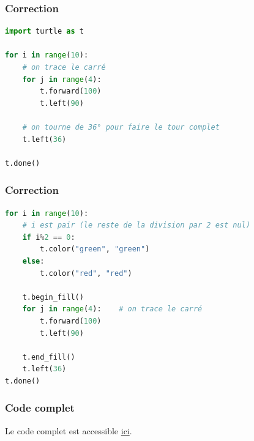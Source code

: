 \documentclass[svgnames,11pt]{beamer}
\begin{document}
\begin{frame}[fragile]
    \frametitle{Correction}

\begin{center}
\begin{lstlisting}[language=Python , basicstyle=\ttfamily\small, xleftmargin=1em, xrightmargin=1em]
import turtle as t

for i in range(10):
    # on trace le carré
    for j in range(4):
        t.forward(100)
        t.left(90)

    # on tourne de 36° pour faire le tour complet
    t.left(36)

t.done()
\end{lstlisting}
\label{CODE}
\end{center}   

\end{frame}
\begin{frame}[fragile]
    \frametitle{Correction}

\begin{center}
\begin{lstlisting}[language=Python , basicstyle=\ttfamily\small, xleftmargin=1em, xrightmargin=1em]
for i in range(10):
    # i est pair (le reste de la division par 2 est nul)
    if i%2 == 0:
        t.color("green", "green")
    else:
        t.color("red", "red")

    t.begin_fill()
    for j in range(4):    # on trace le carré
        t.forward(100)
        t.left(90)

    t.end_fill()
    t.left(36)
t.done()
\end{lstlisting}
\label{CODE}
\end{center}

\end{frame}
\begin{frame}
    \frametitle{Code complet}

    Le code complet est accessible \href{https://cviroulaud.github.io/premiere/langages/dessiner-avec-turtle/scripts/turtle.zip}{ici}.

\end{frame}
\end{document}
